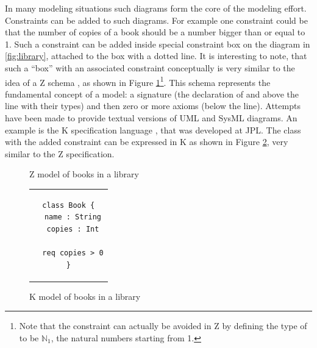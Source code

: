 In many modeling situations such diagrams form the core of the modeling effort. Constraints can be added to such diagrams.
For example one constraint could be that the number of copies of a book should be a number bigger than or equal to 1. Such a constraint can be added inside special constraint box on the diagram  in \ref{fig:library}, attached to the  box
with a dotted line. It is interesting to note, that such a ``box''
with an associated constraint conceptually is very similar to the idea of a Z schema \cite{?}, as shown in Figure \ref{fig:book-z}\footnote{Note that the constraint can actually be avoided in Z by defining the type of  to be $\mathbb{N}_1$, the natural numbers starting from 1.}.
This schema represents the fundamental concept of a model: a signature (the declaration of  and  above the line with their types) and then zero or more axioms (below the line). 
%
Attempts have been made to provide textual versions of UML and SysML diagrams. An example is  the K specification language \cite{?}, that was developed at JPL. 
The  class with the added constraint can be expressed in K as shown in Figure 
\ref{fig:book-k}, very similar
to the Z specification. 

\begin{figure}
\caption{Z model of books in a library}
\label{fig:book-z}
\end{figure}

\begin{figure}
\begin{center}
\begin{tabular}{c}
\begin{lstlisting}[language=klang]
class Book {
  name : String
  copies : Int
   
  req copies > 0
}
\end{lstlisting}
\end{tabular}
\end{center}
\caption{K model of books in a library}
\label{fig:book-k}
\end{figure}


